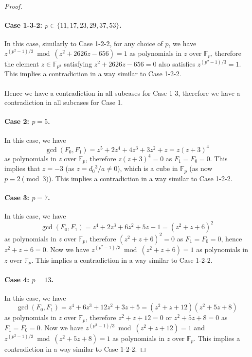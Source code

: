 \documentclass{article}
\theoremstyle{definition}
\newcommand{\FF}{\mathbb{F}}
\begin{document}
\begin{proof}
\paragraph{Case 1-3-2: $p \in \{11,17,23,29,37,53\}$.}

In this case, similarly to Case 1-2-2, for any choice of $p$, we have $z^{(p^2 - 1) / 3} \bmod (z^2 + 2626 z - 656) = 1$ as polynomials in $z$ over $\FF_p$, therefore the element $z \in \FF_{p^2}$ satisfying $z^2 + 2626 z - 656 = 0$ also satisfies $z^{(p^2 - 1) / 3} = 1$.
This implies a contradiction in a way similar to Case 1-2-2.

\paragraph{}

Hence we have a contradiction in all subcases for Case 1-3, therefore we have a contradiction in all subcases for Case 1.

\paragraph{Case 2: $p = 5$.}

In this case, we have
\[
\gcd(F_0,F_1)
= z^5 + 2 z^4 + 4 z^3 + 3 z^2 + z
= z (z + 3)^4
\]
as polynomials in $z$ over $\FF_p$, therefore $z (z + 3)^4 = 0$ as $F_1 = F_0 = 0$.
This implies that $z = -3$ (as $z = d_0{}^3 / a \neq 0$), which is a cube in $\FF_p$ (as now $p \equiv 2 \pmod{3}$).
This implies a contradiction in a way similar to Case 1-2-2.

\paragraph{Case 3: $p = 7$.}

In this case, we have
\[
\gcd(F_0,F_1)
= z^4 + 2 z^3 + 6 z^2 + 5 z + 1
= (z^2 + z + 6)^2
\]
as polynomials in $z$ over $\FF_p$, therefore $(z^2 + z + 6)^2 = 0$ as $F_1 = F_0 = 0$, hence $z^2 + z + 6 = 0$.
Now we have $z^{(p^2 - 1) / 3} \bmod (z^2 + z + 6) = 1$ as polynomials in $z$ over $\FF_p$.
This implies a contradiction in a way similar to Case 1-2-2.

\paragraph{Case 4: $p = 13$.}

In this case, we have
\[
\gcd(F_0,F_1)
= z^4 + 6 z^3 + 12 z^2 + 3 z + 5
= (z^2 + z + 12) (z^2 + 5 z + 8)
\]
as polynomials in $z$ over $\FF_p$, therefore $z^2 + z + 12 = 0$ or $z^2 + 5 z + 8 = 0$ as $F_1 = F_0 = 0$.
Now we have $z^{(p^2 - 1) / 3} \bmod (z^2 + z + 12) = 1$ and $z^{(p^2 - 1) / 3} \bmod (z^2 + 5 z + 8) = 1$ as polynomials in $z$ over $\FF_p$.
This implies a contradiction in a way similar to Case 1-2-2.


\end{proof}
\end{document}
